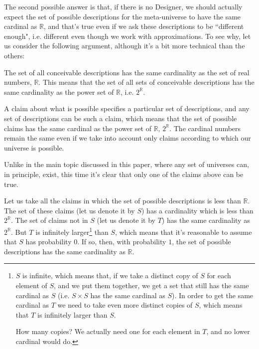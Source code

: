 \documentclass[a4paper
,draft
]{article}
\def\reale{\mathbb{R}}
\newcommand{\paper}[1]{paper}
\newcommand{\ghilimele}[1]{``#1"}
\begin{document}
The second possible answer is that, if there is no Designer, we should actually
expect the set of
possible descriptions for the meta-universe to have the same cardinal as
$\reale$, and that's true even
if we ask these descriptions to be \ghilimele{different enough},
i.e. different even though we work with approximations.
To see why, let us consider the following argument, although it's a bit more
technical than the others:

The set of all conceivable descriptions has the same cardinality as the
set of real numbers, $\reale$. This means that the
set of all sets of conceivable descriptions
has the same cardinality as the power set of $\reale$, i.e. $2^\reale$.

A claim about what is possible specifies a particular set of descriptions,
and any set of descriptions can be such a claim,
which means that the set of possible claims has the same cardinal as
the power set of $\reale$, $2^\reale$.
The cardinal numbers remain the same even if we take into account only claims
according to which our universe is possible.

Unlike in the main topic discussed in this
\paper{}, where any set of universes can, in principle, exist,
this time it's clear that only one of the claims above can be true.


Let us take all the claims in which the set of possible descriptions
is less than $\reale$.
The set of these claims (let us denote it by $S$)
has a cardinality which is less than $2^\reale$.
The set of claims not in $S$ (let us denote it by $T$) has the same cardinality
as $2^\reale$.
But $T$ is infinitely larger\footnote{
  $S$ is infinite, which means that, if we take a distinct copy of $S$ for each
  element of $S$, and we put them together, we get a set that still has the same
  cardinal as $S$ (i.e. $S\times S$ has the same cardinal as $S$). In order to
  get the same cardinal as $T$ we need to take even more distinct copies of $S$,
  which means that $T$ is infinitely larger than $S$.

  How many copies? We actually need one for each element in $T$, and no lower
  cardinal would do.
} than $S$, which means that it's reasonable to assume that $S$ has probability $0$.
If so, then, with probability $1$, the set of possible descriptions has the same
cardinality as $\reale$.
\end{document}

